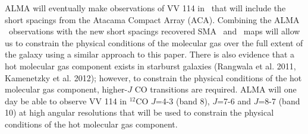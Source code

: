 ALMA will eventually make observations of VV 114 in \cosix\ that will include the short spacings from the Atacama Compact Array (ACA). Combining the ALMA \cosix\ observations with the new short spacings recovered SMA \cotwo\ and \cothree\ maps will allow us to constrain the physical conditions of the molecular gas over the full extent of the galaxy using a similar approach to this paper. There is also evidence that a hot molecular gas component exists in starburst galaxies (Rangwala et al. 2011, Kamenetzky et al. 2012); however, to constrain the physical conditions of the hot molecular gas component, higher-$J$ CO transitions are required. ALMA will one day be able to observe VV 114 in $^{12}$CO $J$=4-3 (band 8), $J$=7-6 and $J$=8-7 (band 10) at high angular resolutions that will be used to constrain the physical conditions of the hot molecular gas component.






